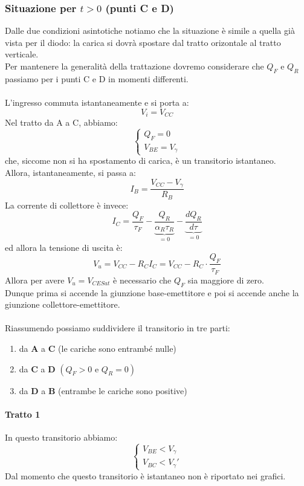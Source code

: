 \documentclass[../main.tex]{subfiles}
\begin{document}
	\subsubsection{Situazione per $t > 0$ (punti C e D)}\label{par:20.3.3}
	Dalle due condizioni asintotiche notiamo che la situazione è simile a quella già vista per il diodo: la carica si dovrà spostare dal tratto orizontale al tratto verticale.\\
	Per mantenere la generalità della trattazione dovremo considerare che $Q_F$ e $Q_R$ passiamo per i punti C e D in momenti differenti.\\\\
	L'ingresso commuta istantaneamente e si porta a:
	\[ V_i = V_{CC} \]
	Nel tratto da A a C, abbiamo:
	\[ \begin{cases} Q_F = 0 \\ V_{BE} = V_\gamma \end{cases} \]
	che, siccome non si ha spostamento di carica, è un transitorio istantaneo.\\
	Allora, istantaneamente, si passa a:
	\[ I_B = \frac{V_{CC} - V_\gamma}{R_B} \]
	La corrente di collettore è invece:
	\[ I_C = \frac{Q_F}{\tau_F} - \underbrace{\frac{Q_R}{\alpha_R \tau_R}}_{=0} - \underbrace{\frac{dQ_R}{d\tau}}_{=0} \]
	ed allora la tensione di uscita è:
	\[ V_u = V_{CC} - R_C I_C = V_{CC} - R_C \cdot \frac{Q_F}{\tau_F} \]
	Allora per avere $V_u = V_{CESat}$ è necessario che $Q_F$ sia maggiore di zero.\\
	Dunque prima si accende la giunzione base-emettitore e poi si accende anche la giunzione collettore-emettitore.\\\\
	Riassumendo possiamo suddividere il transitorio in tre parti:
	\begin{enumerate}
		\item da $\mathbf{A}$ a $\mathbf{C}$ (le cariche sono entrambé nulle)
		\item da \(\mathbf{C}\) a \(\mathbf{D}\) \((Q_{F} > 0\text{ e }Q_{R} = 0)\)
		\item da $\mathbf{D}$ a $\mathbf{B}$ (entrambe le cariche sono positive)
	\end{enumerate}
	\paragraph{Tratto 1}
	In questo transitorio abbiamo:
	\[ \begin{cases} V_{BE} < V_\gamma \\ V_{BC} < V_\gamma' \end{cases} \]
	Dal momento che questo transitorio è istantaneo non è riportato nei grafici.
\end{document}
